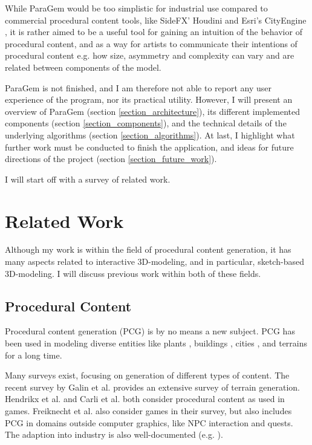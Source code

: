 \documentclass[english]{article}
\begin{document}
While ParaGem would be too simplistic for industrial use compared to commercial procedural content tools, like SideFX' Houdini \cite{houdini} and Esri's CityEngine \cite{cityengine}, it is rather aimed to be a useful tool for gaining an intuition of the behavior of procedural content, and as a way for artists to communicate their intentions of procedural content e.g. how size, asymmetry and complexity can vary and are related between components of the model.

ParaGem is not finished, and I am therefore not able to report any user experience of the program, nor its practical utility. However, I will present an overview of ParaGem (section \ref{section_architecture}), its different implemented components (section \ref{section_components}), and the technical details of the underlying algorithms (section \ref{section_algorithms}). At last, I highlight what further work must be conducted to finish the application, and ideas for future directions of the project (section \ref{section_future_work}).

I will start off with a survey of related work.

\pagebreak

\section{Related Work} \label{related_work}

Although my work is within the field of procedural content generation, it has many aspects related to interactive 3D-modeling, and in particular, sketch-based 3D-modeling. I will discuss previous work within both of these fields.

\subsection{Procedural Content}

Procedural content generation (PCG) is by no means a new subject. PCG has been used in modeling diverse entities like plants \cite{plant_l_system}, buildings \cite{building_shape_grammar}, cities \cite{procedural_city_modeling}, and terrains \cite{early_terrain_generation} for a long time. 

Many surveys exist, focusing on generation of different types of content. The recent survey by Galin et al. \cite{terrain_survey_2019} provides an extensive survey of terrain generation. Hendrikx et al. \cite{pcg_survey_2013} and Carli et al. \cite{brazilian_pcg_survey} both consider procedural content as used in games. Freiknecht et al. \cite{pcg_survey_2017} also consider games in their survey, but also includes PCG in domains outside computer graphics, like NPC interaction and quests. The adaption into industry is also well-documented (e.g. \cite{amato2017}).
\end{document}
